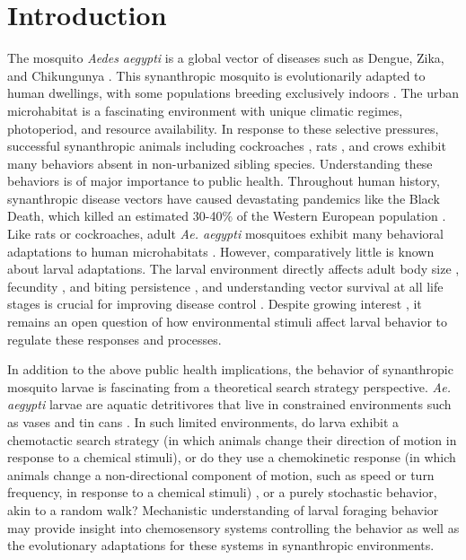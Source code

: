 \linenumbers
\section*{Introduction}
\let\thefootnote\relax{}

\noindent The mosquito \textit{Aedes aegypti} is a global vector of diseases such as Dengue, Zika, and Chikungunya \cite{Weaver2018-et}. This synanthropic mosquito is evolutionarily adapted to human dwellings, with some populations breeding exclusively indoors \cite{Powell2013-lq,Brown2014-yw}. The urban microhabitat is a fascinating environment with unique climatic regimes, photoperiod, and resource availability. In response to these selective pressures, successful synanthropic animals including cockroaches \cite{Schapheer2018-vh}, rats \cite{Feng2014-rd}, and crows \cite{Marzluff2001-tc} exhibit many behaviors absent in non-urbanized sibling species. Understanding these behaviors is of major importance to public health. Throughout human history, synanthropic disease vectors have caused devastating pandemics like the Black Death, which killed an estimated 30-40${\%}$ of the Western European population \cite{Aplin2011-ic,Raoult2000-gp}. Like rats or cockroaches, adult \textit{Ae. aegypti} mosquitoes exhibit many behavioral adaptations to human microhabitats \cite{Powell2013-lq,Gubler2014-no}. However, comparatively little is known about larval adaptations. The larval environment directly affects adult body size \cite{Christophers1960-xf,Briegel1990-qb}, fecundity \cite{Briegel1990-qb}, and biting persistence \cite{Nasci1991-mu}, and understanding vector survival at all life stages is crucial for improving disease control \cite{Lutz2017-ds}. Despite growing interest \cite{Skiff2014-dp,Reiskind2018-wb,Zahouli2017-hj}, it remains an open question of how environmental stimuli affect larval behavior to regulate these responses and processes.

In addition to the above public health implications, the behavior of synanthropic mosquito larvae is fascinating from a theoretical search strategy perspective. \textit{Ae. aegypti} larvae are aquatic detritivores that live in constrained environments such as vases and tin cans \cite{Christophers1960-xf}. In such limited environments, do larva exhibit a chemotactic search strategy (in which animals change their direction of motion in response to a chemical stimuli), or do they use a chemokinetic response (in which animals change a non-directional component of motion, such as speed or turn frequency, in response to a chemical stimuli) \cite{Benhamou1989-zu}, or a purely stochastic behavior, akin to a random walk? Mechanistic understanding of larval foraging behavior may provide insight into chemosensory systems controlling the behavior as well as the evolutionary adaptations for these systems in synanthropic environments.

